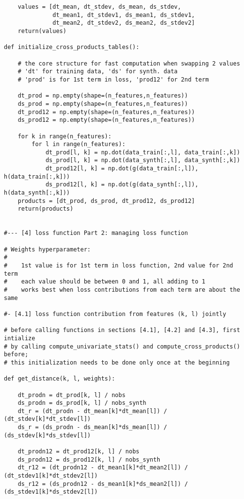 \documentclass[oneside,10pt]{book}
\begin{document}
\begin{lstlisting}
    values = [dt_mean, dt_stdev, ds_mean, ds_stdev,
              dt_mean1, dt_stdev1, ds_mean1, ds_stdev1,
              dt_mean2, dt_stdev2, ds_mean2, ds_stdev2]
    return(values)

def initialize_cross_products_tables():

    # the core structure for fast computation when swapping 2 values
    # 'dt' for training data, 'ds' for synth. data
    # 'prod' is for 1st term in loss, 'prod12' for 2nd term

    dt_prod = np.empty(shape=(n_features,n_features))
    ds_prod = np.empty(shape=(n_features,n_features))
    dt_prod12 = np.empty(shape=(n_features,n_features))
    ds_prod12 = np.empty(shape=(n_features,n_features))

    for k in range(n_features):
        for l in range(n_features):
            dt_prod[l, k] = np.dot(data_train[:,l], data_train[:,k])  
            ds_prod[l, k] = np.dot(data_synth[:,l], data_synth[:,k])   
            dt_prod12[l, k] = np.dot(g(data_train[:,l]), h(data_train[:,k])) 
            ds_prod12[l, k] = np.dot(g(data_synth[:,l]), h(data_synth[:,k])) 
    products = [dt_prod, ds_prod, dt_prod12, ds_prod12]
    return(products)
    

#--- [4] loss function Part 2: managing loss function

# Weights hyperparameter:
#
#    1st value is for 1st term in loss function, 2nd value for 2nd term
#    each value should be between 0 and 1, all adding to 1
#    works best when loss contributions from each term are about the same

#- [4.1] loss function contribution from features (k, l) jointly

# before calling functions in sections [4.1], [4.2] and [4.3], first intialize
# by calling compute_univariate_stats() and compute_cross_products() before;
# this initialization needs to be done only once at the beginning

def get_distance(k, l, weights):

    dt_prodn = dt_prod[k, l] / nobs
    ds_prodn = ds_prod[k, l] / nobs_synth
    dt_r = (dt_prodn - dt_mean[k]*dt_mean[l]) / (dt_stdev[k]*dt_stdev[l])
    ds_r = (ds_prodn - ds_mean[k]*ds_mean[l]) / (ds_stdev[k]*ds_stdev[l])

    dt_prodn12 = dt_prod12[k, l] / nobs  
    ds_prodn12 = ds_prod12[k, l] / nobs_synth 
    dt_r12 = (dt_prodn12 - dt_mean1[k]*dt_mean2[l]) / (dt_stdev1[k]*dt_stdev2[l])
    ds_r12 = (ds_prodn12 - ds_mean1[k]*ds_mean2[l]) / (ds_stdev1[k]*ds_stdev2[l])


\end{lstlisting}
\end{document}
